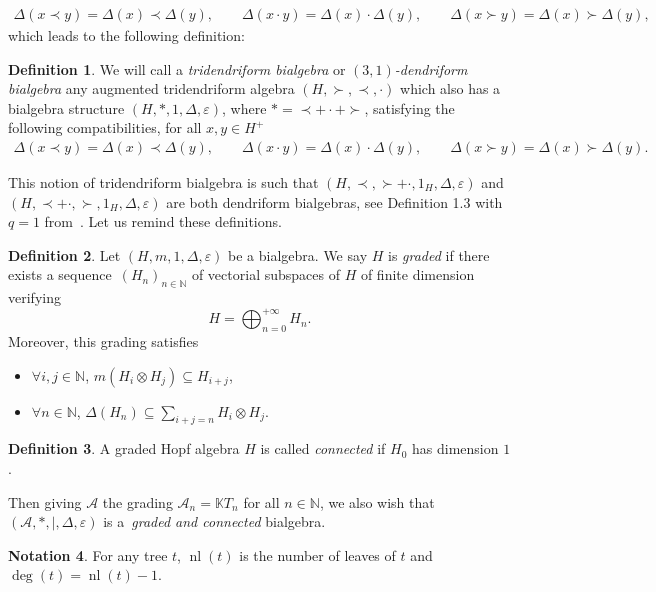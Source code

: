 \documentclass[pdftex]{sigma}
\numberwithin{equation}{section}
\theoremstyle{definition}
\newtheorem{defi}{Definition}[section]
\newtheorem{Not}[defi]{Notation}
\theoremstyle{plain}
\newcommand{\K}{\mathbb{K}}
\newcommand{\N}{\mathbb{N}}
\DeclareMathOperator{\nf}{nl}
\begin{document}
\begin{gather*}
	\Delta(x\prec y)=\Delta(x)\prec \Delta(y),\qquad \Delta(x\cdot y)=\Delta(x)\cdot\Delta(y),\qquad \Delta(x\succ y)=\Delta(x)\succ\Delta(y),	
\end{gather*}
which leads to the following definition:
\begin{defi}%
	We will call a \emph{tridendriform bialgebra} or \emph{$(3,1)$-dendriform bialgebra} any augmented tridendriform algebra $(H,\succ,\prec,\cdot)$ which also has a bialgebra structure $(H,*,1,\Delta,\varepsilon)$, where $*=\prec+\cdot+\succ$, satisfying the following compatibilities, for all $x,y\in H^+$
	\begin{gather*}
		\Delta(x\prec y)=\Delta(x)\prec \Delta(y),\qquad \Delta(x\cdot y)=\Delta(x)\cdot\Delta(y),\qquad \Delta(x\succ y)=\Delta(x)\succ\Delta(y).	
	\end{gather*}
\end{defi}

This notion of tridendriform bialgebra is such that $(H,\prec,\succ+\cdot,1_H,\Delta,\varepsilon)$ and $(H,\prec+\cdot,\succ,\allowbreak 1_H,\Delta,\varepsilon)$ are both dendriform bialgebras, see Definition 1.3 with $q=1$ from~\cite{Tridend}.
 Let us remind these definitions.

\begin{defi}\label{graded}
	Let $(H,m,1,\Delta,\varepsilon)$ be a bialgebra. We say $H$ is \emph{graded} if there exists a sequence~$(H_n)_{n\in\N}$ of vectorial subspaces of $H$ of finite dimension verifying
	\[
	H=\bigoplus_{n=0}^{+\infty}H_n.
	\]
	Moreover, this grading satisfies
	\begin{itemize}\itemsep=0pt
		\item $\forall i,j\in\N$, $m(H_i\otimes H_j)\subseteq H_{i+j}$,
		\item $\forall n\in\N$, $\Delta(H_n)\subseteq \sum_{i+j=n} H_i\otimes H_j$.
	\end{itemize}
\end{defi}

\begin{defi}\label{connected}
	A graded Hopf algebra $H$ is called \emph{connected} if $H_0$ has dimension $1$.
\end{defi}

Then giving $\mathcal{A}$ the grading $\mathcal{A}_n=\K T_n$ for all $n\in \N$, we also wish that $(\mathcal{A},*,|,\Delta,\varepsilon)$ is a~\emph{graded and connected} bialgebra.
\begin{Not}
	For any tree $t$, $\nf(t)$ is the number of leaves of $t$ and $\deg(t)=\nf(t)-1$.
\end{Not}
\end{document}
